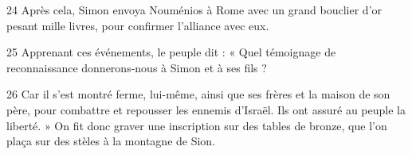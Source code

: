 

24 Après cela, Simon envoya Nouménios à Rome avec un grand bouclier d’or pesant mille livres, pour confirmer l’alliance avec eux.

25 Apprenant ces événements, le peuple dit : « Quel témoignage de reconnaissance donnerons-nous à Simon et à ses fils ?

26 Car il s’est montré ferme, lui-même, ainsi que ses frères et la maison de son père, pour combattre et repousser les ennemis d’Israël. Ils ont assuré au peuple la liberté. » On fit donc graver une inscription sur des tables de bronze, que l’on plaça sur des stèles à la montagne de Sion.